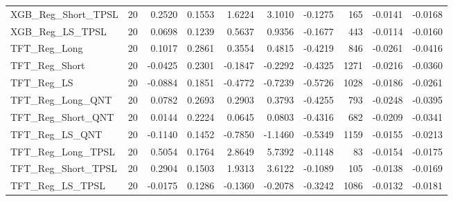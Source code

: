 \begin{tabular}{llrrrrrrrr}
XGB\_Reg\_Short\_TPSL & 20 & 0.2520 & 0.1553 & 1.6224 & 3.1010 & -0.1275 & 165 & -0.0141 & -0.0168 \\
\cline{1-10}
XGB\_Reg\_LS\_TPSL & 20 & 0.0698 & 0.1239 & 0.5637 & 0.9356 & -0.1677 & 443 & -0.0114 & -0.0160 \\
\cline{1-10}
TFT\_Reg\_Long & 20 & 0.1017 & 0.2861 & 0.3554 & 0.4815 & -0.4219 & 846 & -0.0261 & -0.0416 \\
\cline{1-10}
TFT\_Reg\_Short & 20 & -0.0425 & 0.2301 & -0.1847 & -0.2292 & -0.4325 & 1271 & -0.0216 & -0.0360 \\
\cline{1-10}
TFT\_Reg\_LS & 20 & -0.0884 & 0.1851 & -0.4772 & -0.7239 & -0.5726 & 1028 & -0.0186 & -0.0261 \\
\cline{1-10}
TFT\_Reg\_Long\_QNT & 20 & 0.0782 & 0.2693 & 0.2903 & 0.3793 & -0.4255 & 793 & -0.0248 & -0.0395 \\
\cline{1-10}
TFT\_Reg\_Short\_QNT & 20 & 0.0144 & 0.2224 & 0.0645 & 0.0803 & -0.4316 & 682 & -0.0209 & -0.0341 \\
\cline{1-10}
TFT\_Reg\_LS\_QNT & 20 & -0.1140 & 0.1452 & -0.7850 & -1.1460 & -0.5349 & 1159 & -0.0155 & -0.0213 \\
\cline{1-10}
TFT\_Reg\_Long\_TPSL & 20 & 0.5054 & 0.1764 & 2.8649 & 5.7392 & -0.1148 & 83 & -0.0154 & -0.0175 \\
\cline{1-10}
TFT\_Reg\_Short\_TPSL & 20 & 0.2904 & 0.1503 & 1.9313 & 3.6122 & -0.1089 & 105 & -0.0138 & -0.0169 \\
\cline{1-10}
TFT\_Reg\_LS\_TPSL & 20 & -0.0175 & 0.1286 & -0.1360 & -0.2078 & -0.3242 & 1086 & -0.0132 & -0.0181 \\
\cline{1-10}
\bottomrule
\end{tabular}
